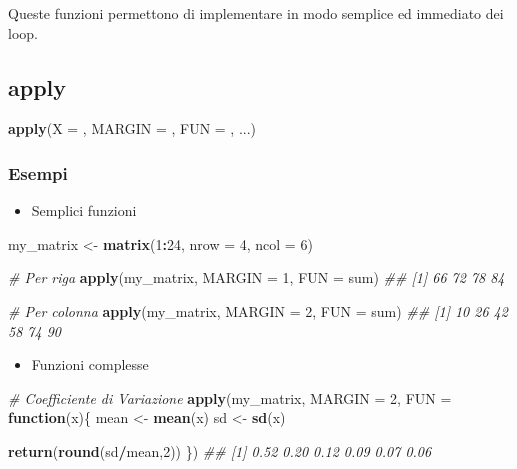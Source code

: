 \documentclass[
]{book}
\newenvironment{Shaded}{\begin{snugshade}}{\end{snugshade}}
\newcommand{\CommentTok}[1]{\textcolor[rgb]{0.56,0.35,0.01}{\textit{#1}}}
\newcommand{\ControlFlowTok}[1]{\textcolor[rgb]{0.13,0.29,0.53}{\textbf{#1}}}
\newcommand{\DataTypeTok}[1]{\textcolor[rgb]{0.13,0.29,0.53}{#1}}
\newcommand{\DecValTok}[1]{\textcolor[rgb]{0.00,0.00,0.81}{#1}}
\newcommand{\KeywordTok}[1]{\textcolor[rgb]{0.13,0.29,0.53}{\textbf{#1}}}
\newcommand{\NormalTok}[1]{#1}
\newcommand{\OperatorTok}[1]{\textcolor[rgb]{0.81,0.36,0.00}{\textbf{#1}}}
\newcommand{\StringTok}[1]{\textcolor[rgb]{0.31,0.60,0.02}{#1}}
\providecommand{\tightlist}{%
  \setlength{\itemsep}{0pt}\setlength{\parskip}{0pt}}
\begin{document}
Queste funzioni permettono di implementare in modo semplice ed immediato dei loop.

\hypertarget{apply}{%
\subsection{apply}\label{apply}}

\begin{Shaded}
\begin{Highlighting}[]
\KeywordTok{apply}\NormalTok{(}\DataTypeTok{X =}\NormalTok{ , }\DataTypeTok{MARGIN =}\NormalTok{ , }\DataTypeTok{FUN =}\NormalTok{ , ...)}
\end{Highlighting}
\end{Shaded}

\hypertarget{esempi}{%
\subsubsection*{Esempi}\label{esempi}}

\begin{itemize}
\tightlist
\item
  Semplici funzioni
\end{itemize}

\begin{Shaded}
\begin{Highlighting}[]
\NormalTok{my_matrix <-}\StringTok{ }\KeywordTok{matrix}\NormalTok{(}\DecValTok{1}\OperatorTok{:}\DecValTok{24}\NormalTok{, }\DataTypeTok{nrow =} \DecValTok{4}\NormalTok{, }\DataTypeTok{ncol =} \DecValTok{6}\NormalTok{)}

\CommentTok{# Per riga}
\KeywordTok{apply}\NormalTok{(my_matrix, }\DataTypeTok{MARGIN =} \DecValTok{1}\NormalTok{, }\DataTypeTok{FUN =}\NormalTok{ sum)}
\CommentTok{## [1] 66 72 78 84}

\CommentTok{# Per colonna}
\KeywordTok{apply}\NormalTok{(my_matrix, }\DataTypeTok{MARGIN =} \DecValTok{2}\NormalTok{, }\DataTypeTok{FUN =}\NormalTok{ sum)}
\CommentTok{## [1] 10 26 42 58 74 90}
\end{Highlighting}
\end{Shaded}

\begin{itemize}
\tightlist
\item
  Funzioni complesse
\end{itemize}

\begin{Shaded}
\begin{Highlighting}[]
\CommentTok{# Coefficiente di Variazione}
\KeywordTok{apply}\NormalTok{(my_matrix, }\DataTypeTok{MARGIN =} \DecValTok{2}\NormalTok{, }\DataTypeTok{FUN =} \ControlFlowTok{function}\NormalTok{(x)\{}
\NormalTok{  mean <-}\StringTok{ }\KeywordTok{mean}\NormalTok{(x)}
\NormalTok{  sd <-}\StringTok{ }\KeywordTok{sd}\NormalTok{(x)}
  
  \KeywordTok{return}\NormalTok{(}\KeywordTok{round}\NormalTok{(sd}\OperatorTok{/}\NormalTok{mean,}\DecValTok{2}\NormalTok{))}
\NormalTok{\})}
\CommentTok{## [1] 0.52 0.20 0.12 0.09 0.07 0.06}
\end{Highlighting}
\end{Shaded}
\end{document}
